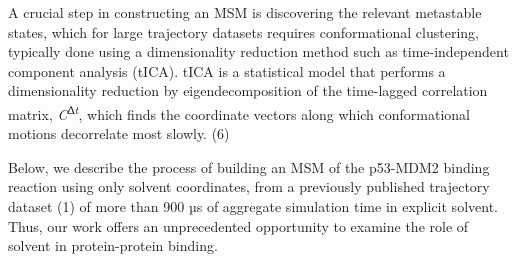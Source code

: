 A crucial step in constructing an MSM is discovering the relevant
metastable states, which for large trajectory datasets requires
conformational clustering, typically done using a dimensionality
reduction method such as time-independent component analysis (tICA).
tICA is a statistical model that performs a dimensionality reduction by
eigendecomposition of the time-lagged correlation matrix,
\emph{C}\textsuperscript{∆\emph{t}}, which finds the coordinate vectors
along which conformational motions decorrelate most slowly. (6)

Below, we describe the process of building an MSM of the p53-MDM2
binding reaction using only solvent coordinates, from a previously
published trajectory dataset (1) of more than 900 µs of aggregate
simulation time in explicit solvent. Thus, our work offers an
unprecedented opportunity to examine the role of solvent in
protein-protein binding.

